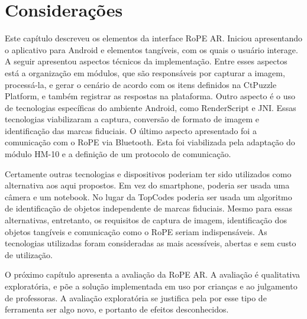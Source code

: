 \section{Considerações}

Este capítulo descreveu os elementos da interface RoPE AR. Iniciou apresentando o aplicativo para Android e elementos tangíveis, com os quais o usuário interage. A seguir apresentou aspectos técnicos da implementação. Entre esses aspectos está a organização em módulos, que são responsáveis por capturar a imagem, processá-la, e gerar o cenário de acordo com os itens definidos na CtPuzzle Platform, e também registrar as respostas na plataforma. Outro aspecto é o uso de tecnologias específicas do ambiente Android, como RenderScript e JNI. Essas tecnologias viabilizaram a captura, conversão de formato de imagem e identificação das marcas fiduciais. O último aspecto apresentado foi a comunicação com o RoPE via Bluetooth. Esta foi viabilizada pela adaptação do módulo HM-10 e a definição de um protocolo de comunicação.

Certamente outras tecnologias e dispositivos poderiam ter sido utilizados como alternativa aos aqui propostos. Em vez do smartphone, poderia ser usada uma câmera e um notebook. No lugar da TopCodes poderia ser usada um algoritmo de identificação de objetos independente de marcas fiduciais. Mesmo para essas alternativas, entretanto, os requisitos de captura de imagem, identificação dos objetos tangíveis e comunicação como o RoPE seriam indispensáveis. As tecnologias utilizadas foram consideradas as mais acessíveis, abertas e sem custo de utilização.


O próximo capítulo apresenta a avaliação da RoPE AR. A avaliação é qualitativa exploratória, e põe a solução implementada em uso por crianças e ao julgamento de professoras. A avaliação exploratória se justifica pela por esse tipo de ferramenta ser algo novo, e portanto de efeitos desconhecidos.